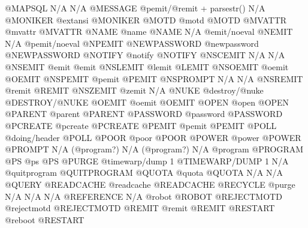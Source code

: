 \documentclass[letterpaper,10pt,english]{sphinxmanual}
\begin{document}
\begin{sphinxVerbatim}[commandchars=\\\{\}]
@MAPSQL                 N/A                            N/A
@MESSAGE                @pemit/@remit + parsestr()     N/A
@MONIKER                @extansi                       @MONIKER
@MOTD                   @motd                          @MOTD
@MVATTR                 @mvattr                        @MVATTR
@NAME                   @name                          @NAME
N/A                     @emit/noeval                   @NEMIT
N/A                     @pemit/noeval                  @NPEMIT
@NEWPASSWORD            @newpassword                   @NEWPASSWORD
@NOTIFY                 @notify                        @NOTIFY
@NSCEMIT                N/A                            N/A
@NSEMIT                 @emit                          @emit
@NSLEMIT                @lemit                         @LEMIT
@NSOEMIT                @oemit                         @OEMIT
@NSPEMIT                @pemit                         @PEMIT
@NSPROMPT               N/A                            N/A
@NSREMIT                @remit                         @REMIT
@NSZEMIT                @zemit                         N/A
@NUKE                   @destroy/@nuke                 @DESTROY/@NUKE
@OEMIT                  @oemit                         @OEMIT
@OPEN                   @open                          @OPEN
@PARENT                 @parent                        @PARENT
@PASSWORD               @password                      @PASSWORD
@PCREATE                @pcreate                       @PCREATE
@PEMIT                  @pemit                         @PEMIT
@POLL                   @doing/header                  @POLL
@POOR                   @poor                          @POOR
@POWER                  @power                         @POWER
@PROMPT                 N/A (@program?)                N/A (@program?)
N/A                     @program                       @PROGRAM
@PS                     @ps                            @PS
@PURGE                  @timewarp/dump 1               @TIMEWARP/DUMP 1
N/A                     @quitprogram                   @QUITPROGRAM
@QUOTA                  @quota                         @QUOTA
N/A                     N/A                            @QUERY
@READCACHE              @readcache                     @READCACHE
@RECYCLE                @purge                         N/A
N/A                     N/A                            @REFERENCE
N/A                     @robot                         @ROBOT
@REJECTMOTD             @rejectmotd                    @REJECTMOTD
@REMIT                  @remit                         @REMIT
@RESTART                @reboot                        @RESTART

\end{sphinxVerbatim}
\end{document}
